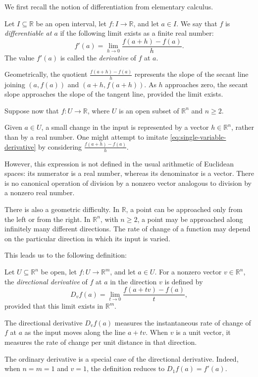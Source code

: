 We first recall the notion of differentiation from elementary calculus.

\begin{definition}
	Let $I\subseteq\mathbb{R}$ be an open interval, let $f:I\to\mathbb{R}$, and	let $a\in I$. We say that $f$ is \emph{differentiable at $a$} if the following limit exists as a finite real number:
	\begin{equation}
		f'(a)
		=
		\lim_{h\to 0}
		\frac{f(a+h)-f(a)}{h}.
		\label{eq:single-variable-derivative}
	\end{equation}
	The value $f'(a)$ is called the \emph{derivative} of $f$ at $a$.
\end{definition}

Geometrically, the quotient $\frac{f(a+h)-f(a)}{h}$ represents the slope of the secant line joining $(a,f(a))$ and $(a+h,f(a+h))$. As $h$ approaches zero, the secant slope approaches the slope of the tangent line, provided the limit exists.

Suppose now that $f:U\to\mathbb{R}$, where $U$ is an open subset of $\mathbb{R}^n$ and $n\geq 2$.

Given $a\in U$, a small change in the input is represented by a vector $h\in\mathbb{R}^n$, rather than by a real number. One might attempt to imitate \eqref{eq:single-variable-derivative} by considering $\frac{f(a+h)-f(a)}{h}$.

However, this expression is not defined in the usual arithmetic of Euclidean spaces: its numerator is a real number, whereas its denominator is a vector. There is no canonical operation of division by a nonzero vector analogous to division by a
nonzero real number.

There is also a geometric difficulty. In $\mathbb{R}$, a point can be
approached only from the left or from the right. In $\mathbb{R}^n$, with $n\geq 2$, a point may be approached along infinitely many different directions. The rate of change of a function may depend on the particular direction in which its input is varied.

This leads us to the following definition:

\begin{definition}
	Let $U\subseteq\mathbb{R}^n$ be open, let
	$f:U\to\mathbb{R}^m$, and let $a\in U$.
	For a nonzero vector $v\in\mathbb{R}^n$, the
	\emph{directional derivative} of $f$ at $a$ in the direction 	$v$ is defined by
	\begin{equation}
		D_vf(a)
		=
		\lim_{t\to 0}
		\frac{f(a+tv)-f(a)}{t},
		\label{eq:directional-derivative}
	\end{equation}
	provided that this limit exists in $\mathbb{R}^m$.
\end{definition}

The directional derivative $D_vf(a)$ measures the instantaneous rate of change
of $f$ at $a$ as the input moves along the line $a+tv$. When $v$ is a unit vector, it measures the rate of change per unit distance in that direction.

\begin{remark}
	The ordinary derivative is a special case of the directional derivative. Indeed, when $n=m=1$ and $v=1$, the definition reduces to $D_1f(a)=f'(a)$.
\end{remark}
